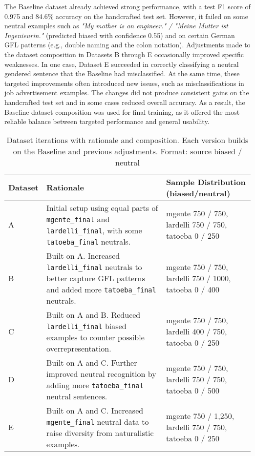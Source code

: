     The Baseline dataset already achieved strong performance, with a test F1 score of 0.975 and 84.6\% accuracy on the handcrafted test set. However, it failed on some neutral examples such as \textit{"My mother is an engineer." / "Meine Mutter ist Ingenieurin."} (predicted biased with confidence 0.55) and on certain German GFL patterns (e.g., double naming and the colon notation). Adjustments made to the dataset composition in Datasets B through E occasionally improved specific weaknesses. In one case, Dataset E succeeded in correctly classifying a neutral gendered sentence that the Baseline had misclassified. At the same time, these targeted improvements often introduced new issues, such as misclassifications in job advertisement examples. The changes did not produce consistent gains on the handcrafted test set and in some cases reduced overall accuracy. As a result, the Baseline dataset composition was used for final training, as it offered the most reliable balance between targeted performance and general usability.

\vspace{0.8em}
\begin{table}[ht]
    \centering
        \begin{tabularx}{\textwidth}{l X >{\raggedright\arraybackslash}X}
    \toprule
    \textbf{Dataset} & \textbf{Rationale} & \textbf{Sample Distribution (biased/neutral)} \\
    \midrule
    A & Initial setup using equal parts of \texttt{mgente\_final} and \texttt{lardelli\_final}, with some \texttt{tatoeba\_final} neutrals. & mgente 750 / 750, lardelli 750 / 750, tatoeba 0 / 250 \\
    B & Built on A. Increased \texttt{lardelli\_final} neutrals to better capture GFL patterns and added more \texttt{tatoeba\_final} neutrals. & mgente 750 / 750, lardelli 750 / 1000, tatoeba 0 / 400 \\
    C & Built on A and B. Reduced \texttt{lardelli\_final} biased examples to counter possible overrepresentation. & mgente 750 / 750, lardelli 400 / 750, tatoeba 0 / 250 \\
    D & Built on A and C. Further improved neutral recognition by adding more \texttt{tatoeba\_final} neutral sentences. & mgente 750 / 750, lardelli 750 / 750, tatoeba 0 / 500 \\
    E & Built on A and C. Increased \texttt{mgente\_final} neutral data to raise diversity from naturalistic examples. & mgente 750 / 1,250, lardelli 750 / 750, tatoeba 0 / 250 \\
    \bottomrule
    \end{tabularx}
    \caption[Dataset iterations with rationale and composition]{Dataset iterations with rationale and composition. Each version builds on the Baseline and previous adjustments. Format: source biased / neutral}
    \label{tab:dataset_versions}
\end{table}


